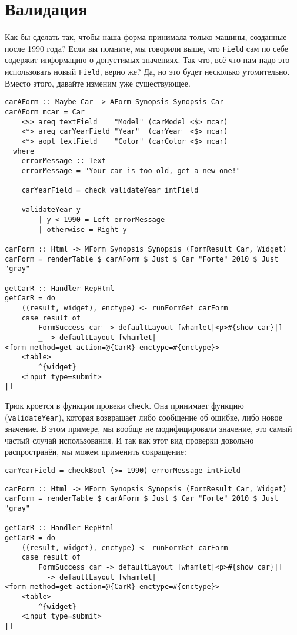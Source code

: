 \section{Валидация}
Как бы сделать так, чтобы наша форма принимала только машины, созданные после 1990 года?
Если вы помните, мы говорили выше, что \lstinline'Field' сам по себе содержит информацию 
о допустимых значениях. Так что, всё что нам надо это использовать новый
\lstinline'Field', верно же? Да, но это будет несколько утомительно. Вместо этого,
давайте изменим уже существующее.
\begin{lstlisting}
carAForm :: Maybe Car -> AForm Synopsis Synopsis Car
carAForm mcar = Car
    <$> areq textField    "Model" (carModel <$> mcar)
    <*> areq carYearField "Year"  (carYear  <$> mcar)
    <*> aopt textField    "Color" (carColor <$> mcar)
  where
    errorMessage :: Text
    errorMessage = "Your car is too old, get a new one!"

    carYearField = check validateYear intField

    validateYear y
        | y < 1990 = Left errorMessage
        | otherwise = Right y

carForm :: Html -> MForm Synopsis Synopsis (FormResult Car, Widget)
carForm = renderTable $ carAForm $ Just $ Car "Forte" 2010 $ Just "gray"

getCarR :: Handler RepHtml
getCarR = do
    ((result, widget), enctype) <- runFormGet carForm
    case result of
        FormSuccess car -> defaultLayout [whamlet|<p>#{show car}|]
        _ -> defaultLayout [whamlet|
<form method=get action=@{CarR} enctype=#{enctype}>
    <table>
        ^{widget}
    <input type=submit>
|]
\end{lstlisting}

Трюк кроется в функции провеки \lstinline'check'. Она принимает функцию 
(\lstinline'validateYear'), которая возвращает либо сообщение об ошибке, либо новое
значение. В этом примере, мы вообще не модифицировали значение, это самый частый случай
использования. И так как этот вид проверки довольно распространён, мы можем применить
сокращение:

\begin{lstlisting}
carYearField = checkBool (>= 1990) errorMessage intField
\end{lstlisting}

\begin{lstlisting}
carForm :: Html -> MForm Synopsis Synopsis (FormResult Car, Widget)
carForm = renderTable $ carAForm $ Just $ Car "Forte" 2010 $ Just "gray"

getCarR :: Handler RepHtml
getCarR = do
    ((result, widget), enctype) <- runFormGet carForm
    case result of
        FormSuccess car -> defaultLayout [whamlet|<p>#{show car}|]
        _ -> defaultLayout [whamlet|
<form method=get action=@{CarR} enctype=#{enctype}>
    <table>
        ^{widget}
    <input type=submit>
|]
\end{lstlisting}

